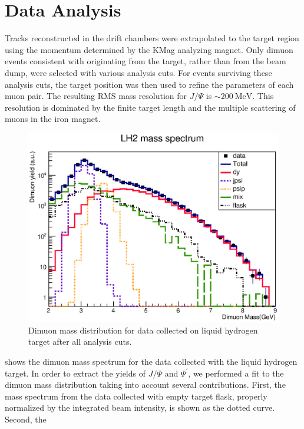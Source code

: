 \documentclass[reprint,aps,unsortedaddress,superscriptaddress,prd,floatfix,showpacs,linenumbers]{revtex4-2}
\begin{document}
\section{Data Analysis}
\label{sec:analysis}
Tracks reconstructed in the drift chambers were extrapolated
to the target region using the momentum determined by
the KMag analyzing magnet. Only dimuon events consistent with originating
from the target, rather than from the beam dump, were selected with various
analysis cuts. For events surviving these analysis cuts, the target
position was then used to
refine the parameters of each muon pair. The resulting
RMS mass resolution for $J/\Psi$ is $\sim\SI{200}{\MeV}$.
This resolution is dominated by the finite target length and the
multiple scattering of muons in the iron magnet.

\begin{figure}
	\includegraphics[width=\linewidth]{massFit/LH2_massfit}
	\caption{Dimuon mass distribution for data collected on liquid hydrogen target
		after all analysis cuts.}
	\label{fig:massfit_LH2}
\end{figure}
 shows the dimuon mass spectrum for the data collected with the
liquid hydrogen target. In order to extract the yields of $J/\Psi$ and
$\Psi^\prime$, we performed a fit to the dimuon mass distribution taking
into account several contributions. First, the mass spectrum from the
data collected with empty target flask, properly normalized by the
integrated beam intensity, is shown as the dotted curve. Second, the 
\end{document}
